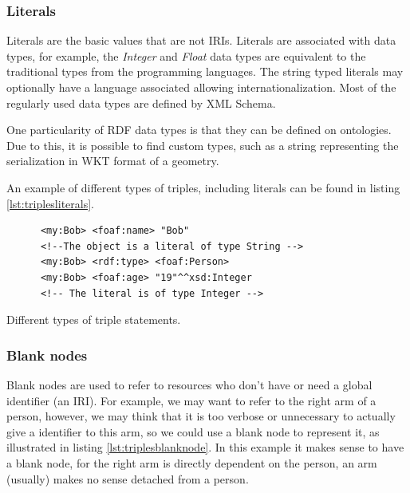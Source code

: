 \subsubsection*{Literals}

Literals are the basic values that are not IRIs. Literals are associated with data types, for example, the \textit{Integer} and \textit{Float} data types are equivalent to the traditional types from the programming languages. The string typed literals may optionally have a language associated allowing internationalization. Most of the regularly used data types are defined by XML Schema\cite{xmlschema}.

One particularity of RDF data types is that they can be defined on ontologies. Due to this, it is possible to find custom types, such as a string representing the serialization in WKT\cite{wkt} format of a geometry. 

An example of different types of triples, including literals can be found in listing \ref{lst:triplesliterals}.

\begin{listing}\centering
  \begin{minipage}{.6\textwidth}
    \begin{verbatim}
      <my:Bob> <foaf:name> "Bob"
      <!--The object is a literal of type String -->
      <my:Bob> <rdf:type> <foaf:Person> 
      <my:Bob> <foaf:age> "19"^^xsd:Integer 
      <!-- The literal is of type Integer -->
    \end{verbatim}
  \end{minipage}
  \caption{Different types of triple statements.}\label{lst:triplesliterals}
\end{listing}

\subsubsection*{Blank nodes}

Blank nodes are used to refer to resources who don't have or need a global identifier (an IRI). For example, we may want to refer to the right arm of a person, however, we may think that it is too verbose or unnecessary to actually give a identifier to this arm, so we could use a blank node to represent it, as illustrated in listing \ref{lst:triplesblanknode}. In this example it makes sense to have a blank node, for the right arm is directly dependent on the person, an arm (usually) makes no sense detached from a person.

